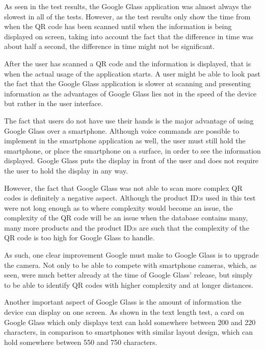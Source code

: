 As seen in the test results, the Google Glass application was almost always the slowest in all of the tests. However, as the test results only show the time from when the QR code has been scanned until when the information is being displayed on screen, taking into account the fact that the difference in time was about half a second, the difference in time might not be significant. 

After the user has scanned a QR code and the information is displayed, that is when the actual usage of the application starts. A user might be able to look past the fact that the Google Glass application is slower at scanning and presenting information as the advantages of Google Glass lies not in the speed of the device but rather in the user interface.

The fact that users do not have use their hands is the major advantage of using Google Glass over a smartphone. Although voice commands are possible to implement in the smartphone application as well, the user must still hold the smartphone, or place the smartphone on a surface, in order to see the information displayed. Google Glass puts the display in front of the user and does not require the user to hold the display in any way.

However, the fact that Google Glass was not able to scan more complex QR codes is definitely a negative aspect. Although the product ID:s used in this test were not long enough as to where complexity would become an issue, the complexity of the QR code will be an issue when the database contains many, many more products and the product ID:s are such that the complexity of the QR code is too high for Google Glass to handle.

As such, one clear improvement Google must make to Google Glass is to upgrade the camera. Not only to be able to compete with smartphone cameras, which, as seen, were much better already at the time of Google Glass' release, but simply to be able to identify QR codes with higher complexity and at longer distances.

Another important aspect of Google Glass is the amount of information the device can display on one screen. As shown in the text length test, a card on Google Glass which only displays text can hold somewhere between 200 and 220 characters, in comparison to smartphones with similar layout design, which can hold somewhere between 550 and 750 characters.

